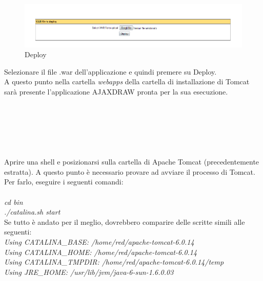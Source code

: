 \begin{figure}[!ht]
\centering
\includegraphics[scale=0.7]{images/DeployTomcat.png}
\caption{Deploy}
\end{figure} 

Selezionare il file .war dell'applicazione e quindi premere su Deploy.\\
A questo punto nella cartella \textit{webapps} della cartella di installazione di Tomcat sar\`a presente l'applicazione AJAXDRAW pronta per la sua esecuzione.\\
\\\\
\\\\
\\
\\
Aprire una shell e posizionarsi sulla cartella di Apache Tomcat (precedentemente estratta).
A questo punto \`e necessario provare ad avviare il processo di Tomcat. Per farlo, eseguire i seguenti comandi:\\
\\
\textit{cd bin}\\
\textit{./catalina.sh start}\\

Se tutto \`e andato per il meglio, dovrebbero comparire delle scritte simili alle seguenti:\\

\textit{Using CATALINA{\_}BASE: /home/red/apache-tomcat-6.0.14}\\
\textit{Using CATALINA{\_}HOME: /home/red/apache-tomcat-6.0.14}\\
\textit{Using CATALINA{\_}TMPDIR: /home/red/apache-tomcat-6.0.14/temp}\\
\textit{Using JRE{\_}HOME: /usr/lib/jvm/java-6-sun-1.6.0.03}\\
\\

